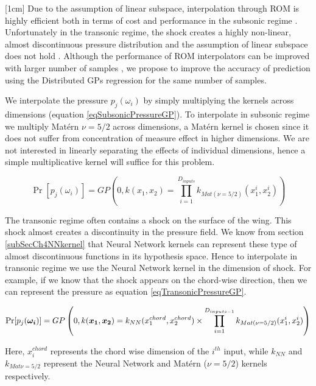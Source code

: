 \begin{mdframed}[hidealllines=true,backgroundcolor=blue!20]
[1cm]
Due to the assumption of linear subspace, interpolation through ROM is highly efficient both in terms of cost and performance in the subsonic regime \cite{verveld2016reduced}. Unfortunately in the transonic regime, the shock creates a highly non-linear, almost discontinuous pressure distribution and the assumption of linear subspace does not hold \cite{li2016performance}. Although the performance of ROM interpolators can be improved with larger number of samples \cite{franz2014interpolation, forrester2008engineering}, we propose to improve the accuracy of prediction using the Distributed GPs regression for the same number of samples.  

We interpolate the pressure $p_{j}(\omega_{i})$ by simply multiplying the kernels across dimensions (equation \ref{eqSubsonicPressureGP}). To interpolate in subsonic regime we multiply Mat\'ern $\nu=5/2$ across dimensions, a Mat\'ern kernel is chosen since it does not suffer from concentration of measure effect in higher dimensions. We are not interested in linearly separating the effects of individual dimensions, hence a simple multiplicative kernel will suffice for this problem. 

\begin{equation}\label{eqSubsonicPressureGP}
\Pr[p_{j}(\omega_{i})] = GP \left( 0, k(x_{1}, x_{2}) = \prod_{i=1}^{D_{inputs}} k_{Mat (\nu =5/2)}(x_{1}^{i}, x_{2}^{i}) \right)
\end{equation}

The transonic regime often contains a shock on the surface of the wing. This shock almost creates a discontinuity in the pressure field. We know from section \ref{subSecCh4NNkernel} that Neural Network kernels can represent these type of almost discontinuous functions in its hypothesis space. Hence to interpolate in transonic regime we use the Neural Network kernel in the dimension of shock. For example, if we know that the shock appears on the chord-wise direction, then we can represent the pressure as equation \ref{eqTransonicPressureGP}.

\begin{equation}\label{eqTransonicPressureGP}
\Pr[p_{j}(\boldsymbol{\omega_{i}})] = GP \left( 0, k(\boldsymbol{x_{1}}, \boldsymbol{x_{2}}) = k_{NN}(x_{1}^{chord}, x_{2}^{chord}) \times \prod_{i=1}^{D_{inputs-1}} k_{Mat (\nu =5/2)}(x_{1}^{i}, x_{2}^{i}) \right)
\end{equation}

Here, $x_i^{chord}$ represents the chord wise dimension of the $i^{th}$ input, while $k_{NN}$ and $k_{Mat \nu =5/2}$ represent the Neural Network and Mat\'ern ($\nu=5/2$) kernels respectively.
\end{mdframed}

